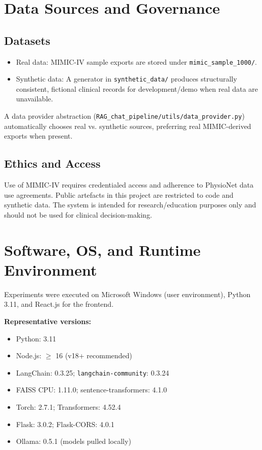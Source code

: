 \section{Data Sources and Governance}

\subsection{Datasets}
\begin{itemize}
  \item Real data: MIMIC-IV sample exports are stored under \texttt{mimic\_sample\_1000/}.
  \item Synthetic data: A generator in \texttt{synthetic\_data/} produces structurally consistent, fictional clinical records for development/demo when real data are unavailable.
\end{itemize}

\noindent A data provider abstraction (\texttt{RAG\_chat\_pipeline/utils/data\_provider.py}) automatically chooses real vs. synthetic sources, preferring real MIMIC-derived exports when present.

\subsection{Ethics and Access}
Use of MIMIC-IV requires credentialed access and adherence to PhysioNet data use agreements. Public artefacts in this project are restricted to code and synthetic data. The system is intended for research/education purposes only and should not be used for clinical decision-making.

\section{Software, OS, and Runtime Environment}
Experiments were executed on Microsoft Windows (user environment), Python 3.11, and React.js for the frontend.

\smallskip
\noindent\textbf{Representative versions:}
\begin{itemize}
  \item Python: 3.11
  \item Node.js: \(\ge\) 16 (v18+ recommended)
  \item LangChain: 0.3.25; \texttt{langchain-community}: 0.3.24
  \item FAISS CPU: 1.11.0; sentence-transformers: 4.1.0
  \item Torch: 2.7.1; Transformers: 4.52.4
  \item Flask: 3.0.2; Flask-CORS: 4.0.1
  \item Ollama: 0.5.1 (models pulled locally)
\end{itemize}

